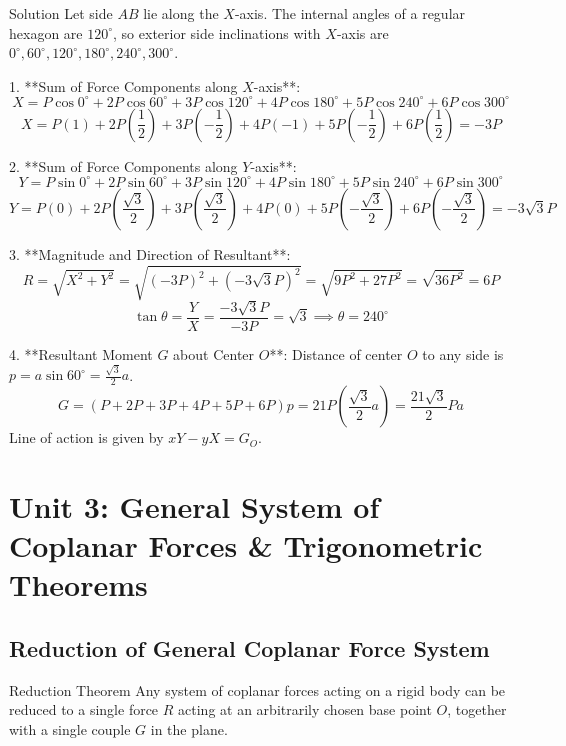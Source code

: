 \documentclass[11pt,a4paper]{article}
\begin{document}
\begin{proofbox}{Solution}
Let side $AB$ lie along the $X$-axis. The internal angles of a regular hexagon are $120^\circ$, so exterior side inclinations with $X$-axis are $0^\circ, 60^\circ, 120^\circ, 180^\circ, 240^\circ, 300^\circ$.

1. **Sum of Force Components along $X$-axis**:
\[
X = P\cos 0^\circ + 2P\cos 60^\circ + 3P\cos 120^\circ + 4P\cos 180^\circ + 5P\cos 240^\circ + 6P\cos 300^\circ
\]
\[
X = P(1) + 2P\left(\frac{1}{2}\right) + 3P\left(-\frac{1}{2}\right) + 4P(-1) + 5P\left(-\frac{1}{2}\right) + 6P\left(\frac{1}{2}\right) = -3P
\]

2. **Sum of Force Components along $Y$-axis**:
\[
Y = P\sin 0^\circ + 2P\sin 60^\circ + 3P\sin 120^\circ + 4P\sin 180^\circ + 5P\sin 240^\circ + 6P\sin 300^\circ
\]
\[
Y = P(0) + 2P\left(\frac{\sqrt{3}}{2}\right) + 3P\left(\frac{\sqrt{3}}{2}\right) + 4P(0) + 5P\left(-\frac{\sqrt{3}}{2}\right) + 6P\left(-\frac{\sqrt{3}}{2}\right) = -3\sqrt{3}P
\]

3. **Magnitude and Direction of Resultant**:
\begin{equation}
R = \sqrt{X^2 + Y^2} = \sqrt{(-3P)^2 + (-3\sqrt{3}P)^2} = \sqrt{9P^2 + 27P^2} = \sqrt{36P^2} = 6P
\end{equation}
\[
\tan\theta = \frac{Y}{X} = \frac{-3\sqrt{3}P}{-3P} = \sqrt{3} \implies \theta = 240^\circ
\]

4. **Resultant Moment $G$ about Center $O$**:
Distance of center $O$ to any side is $p = a \sin 60^\circ = \frac{\sqrt{3}}{2}a$.
\[
G = (P + 2P + 3P + 4P + 5P + 6P) p = 21 P \left(\frac{\sqrt{3}}{2}a\right) = \frac{21\sqrt{3}}{2} Pa
\]
Line of action is given by $xY - yX = G_O$.
\end{proofbox}

\section{Unit 3: General System of Coplanar Forces \& Trigonometric Theorems}

\subsection{Reduction of General Coplanar Force System}

\begin{theorembox}{Reduction Theorem}
Any system of coplanar forces acting on a rigid body can be reduced to a single force $R$ acting at an arbitrarily chosen base point $O$, together with a single couple $G$ in the plane.
\end{theorembox}
\end{document}
